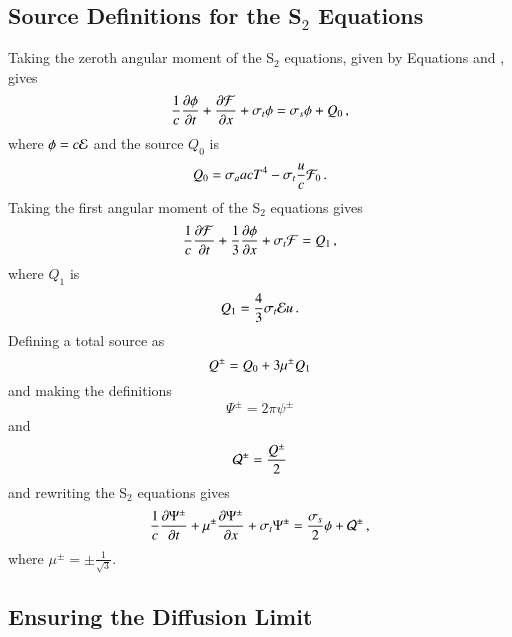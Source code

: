 \subsection{Source Definitions for the \texorpdfstring{S$_2$}{S-2} Equations}

Taking the zeroth angular moment of the S$_2$ equations, given by Equations
 and , gives
\begin{equation}
\frac{1}{c}\dydt{\phi} + \dydx{\F} + \sigma_t\phi = \sigma_s\phi + Q_0 \pec
\lequ{zerothmoment}
\end{equation}
where $\phi = c\mathcal{E}$ and the source $Q_0$ is
\begin{equation}
Q_0 = \sigma_a acT^4 - \sigma_t\frac{u}{c}\F_0 \pep
\lequ{Q0}
\end{equation}
Taking the first angular moment of the S$_2$ equations gives
\begin{equation}
\frac{1}{c}\dydt{\F} + \third\dydx{\phi} + \sigma_t\F = Q_1 \pec
\lequ{firstmoment}
\end{equation}
where $Q_1$ is
\begin{equation}
Q_1 = \frac{4}{3}\sigma_t\E u \pep
\lequ{Q1}
\end{equation}
Defining a total source as
\begin{equation}
Q^\pm = Q_0 + 3\mu^\pm Q_1
\lequ{Qdef}
\end{equation}
and making the definitions
\begin{equation}
  \Psi^\pm = 2\pi\psi^\pm
\end{equation}
and
\begin{equation}
  \mathcal{Q}^\pm = \frac{Q^\pm}{2}
\end{equation}
and rewriting the S$_2$ equations gives
\begin{equation}\lequ{S2Q}
  \frac{1}{c}\dydt{\Psi^\pm} + \mu^\pm\dydx{\Psi^\pm} + \sigma_t\Psi^\pm
  = \frac{\sigma_s}{2}\phi + \Q^\pm \pec
\end{equation}
where $\mu^\pm=\pm\frac{1}{\sqrt{3}}$.

\subsection{Ensuring the Diffusion Limit}\label{diffusion_limit}

